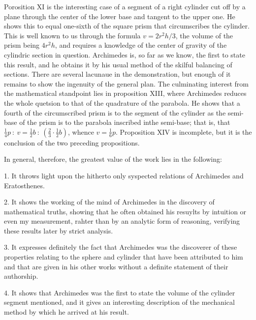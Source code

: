 \documentclass[oneside,12pt]{book}
\begin{document}
Porosition XI is the interesting case of a segment of a right cylinder cut off by a plane through the center of the lower base and tangent to the upper one. He shows this to equal one-sixth of the square prism that circumscribes the cylinder. This is well known to us through the formula $v=2r^2h/3$, the volume of the prism being $4r^2h$, and requires a knowledge of the center of gravity of the cylindric section in question. Archimedes is, so far as we know, the first to state this result, and he obtains it by his usual method of the skilful balancing of sections. There are several lacunaue in the demonstration, but enough of it remains to show the ingenuity of the general plan. The culminating interest from the mathematical standpoint lies in proposition XIII, where Archimedes reduces the whole quetsion to that of the quadrature of the parabola. He shows that a fourth of the circumscribed prism is to the segment of the cylinder as the semi-base of the prism is to the parabola inscribed inthe semi-base; that is, that $\frac{1}{4}p\ :\ v=\frac{1}{2}b\ :\ (\frac{2}{3}\cdot \frac{1}{2}b)$, whence $v=\frac{1}{6}p$. Proposition XIV is incomplete, but it is the conclusion of the two preceding propositions. \par 

In general, therefore, the greatest value of the work lies in the following: \par 

1. It throws light upon the hitherto only syspected relations of Archimedes and Eratosthenes. \par 

2. It shows the working of the mind of Archimedes in the discovery of mathematical truths, showing that he often obtained his resuylts by intuition or even my measurement, rahter than by an analytic form of reasoning, verifying these results later by strict analysis. \par 

3. It expresses definitely the fact that Archimedes was the discoverer of these properties relating to the sphere and cylinder that have been attributed to him and that are given in his other works without a definite statement of their authorship. \par 

4. It shows that Archimedes was the first to state the volume of the cylinder segment mentioned, and it gives an interesting description of the mechanical method by which he arrived at his result. \par 
\end{document}
